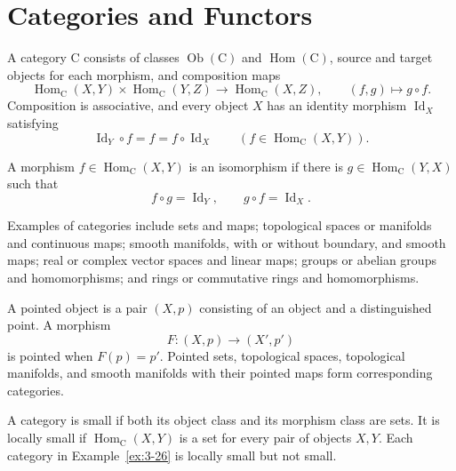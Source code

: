 \section{Categories and Functors}

\begin{definition}
\label{def:3-19-extra-1}
\mathlibok
A category $\mathrm C$ consists of classes $\operatorname{Ob}(\mathrm C)$ and
$\operatorname{Hom}(\mathrm C)$, source and target objects for each morphism,
and composition maps
\[
\operatorname{Hom}_{\mathrm C}(X,Y)\times
\operatorname{Hom}_{\mathrm C}(Y,Z)
\longrightarrow\operatorname{Hom}_{\mathrm C}(X,Z),
\qquad (f,g)\longmapsto g\circ f.
\]
Composition is associative, and every object $X$ has an identity morphism
$\operatorname{Id}_X$ satisfying
\[
\operatorname{Id}_Y\circ f=f=f\circ\operatorname{Id}_X
\qquad(f\in\operatorname{Hom}_{\mathrm C}(X,Y)).
\]
\end{definition}

\begin{definition}
\label{def:3-19-extra-2}
\mathlibok
A morphism $f\in\operatorname{Hom}_{\mathrm C}(X,Y)$ is an isomorphism if
there is $g\in\operatorname{Hom}_{\mathrm C}(Y,X)$ such that
\[
f\circ g=\operatorname{Id}_Y,
\qquad g\circ f=\operatorname{Id}_X.
\]
\end{definition}

\begin{example}[Categories]
\label{ex:3-26}
\leanok
{}
Examples of categories include sets and maps; topological spaces or
manifolds and continuous maps; smooth manifolds, with or without boundary, and
smooth maps; real or complex vector spaces and linear maps; groups or abelian
groups and homomorphisms; and rings or commutative rings and homomorphisms.

A pointed object is a pair $(X,p)$ consisting of an object and a distinguished
point. A morphism
\[
F:(X,p)\longrightarrow(X',p')
\]
is pointed when $F(p)=p'$. Pointed sets, topological spaces, topological
manifolds, and smooth manifolds with their pointed maps form corresponding
categories.
\end{example}

\begin{definition}
\label{def:3-19-extra-3}
\mathlibok
A category is small if both its object class and its morphism class are sets.
It is locally small if $\operatorname{Hom}_{\mathrm C}(X,Y)$ is a set for every
pair of objects $X,Y$. Each category in Example~\ref{ex:3-26} is locally small
but not small.
\end{definition}

